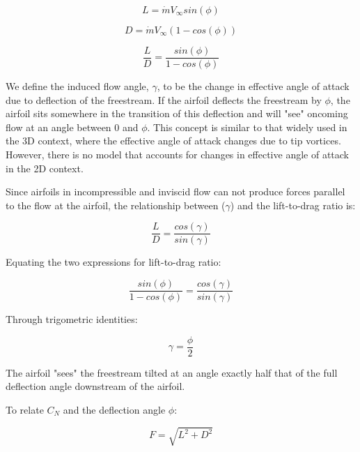 \begin{equation}
\label{eq:lift}
    L = \dot{m} V_\infty sin(\phi)
\end{equation}

\begin{equation}
D = \dot{m} V_\infty (1 - cos(\phi))
\label{eq:drag}
\end{equation}

\begin{equation}
\frac{L}{D} = \frac{sin(\phi)}{1 - cos(\phi)}
\end{equation}

We define the induced flow angle, \(\gamma\), to be the change in effective angle of attack due to deflection of the freestream.
If the airfoil deflects the freestream by \(\phi\), the airfoil sits somewhere in the transition of this deflection and
will "see" oncoming flow at an angle between 0 and \(\phi\).
This concept is similar to that widely used in the 3D context, where the effective angle of attack changes due to tip vortices.
However, there is no model that accounts for changes in effective angle of attack in the 2D context.

Since airfoils in incompressible and inviscid flow can not produce forces parallel to the flow at the airfoil,
the relationship between (\(\gamma\)) and the lift-to-drag ratio is:

\begin{equation}
\frac{L}{D} = \frac{cos(\gamma)}{sin(\gamma)}
\end{equation}

Equating the two expressions for lift-to-drag ratio:

\begin{equation}
\frac{sin(\phi)}{1 - cos(\phi)}
    = \frac{cos(\gamma)}{sin(\gamma)}
\end{equation}

Through trigometric identities:

\begin{equation}
    \gamma = \frac{\phi}{2}
\end{equation}

The airfoil "sees" the freestream tilted at an angle exactly half that of the full deflection angle downstream of the airfoil.

To relate \(C_N\) and the deflection angle \(\phi\):

\begin{equation}
\label{eq:force}
    F = \sqrt{L^2 + D^2}
\end{equation}

